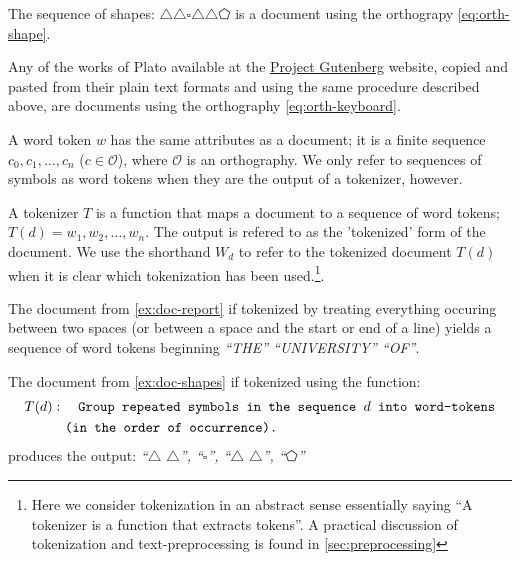 \begin{example}\label{ex:doc-shapes}
    The sequence of shapes: \emph{$\triangle\triangle\square\triangle\triangle\pentagon$} is a document using the orthograpy \ref{eq:orth-shape}.
\end{example}
\vspace{6pt}

\begin{example}\label{ex:doc-plato}
    Any of the works of Plato available at the \href{https://www.gutenberg.org/ebooks/author/93}{Project Gutenberg} website, copied and pasted from their plain text formats and using the same procedure described above, are documents using the orthography \ref{eq:orth-keyboard}.
\end{example}

\begin{definition}
  A word token $w$ has the same attributes as a document; it is a finite sequence $c_0,c_1,\dots,c_n$ ($c\in\mathscr{O}$), where $\mathscr{O}$ is an orthography. We only refer to sequences of symbols as word tokens when they are the output of a tokenizer, however.
\end{definition}

\begin{definition}[Tokenizer]
   A tokenizer $T$ is a function that maps a document to a sequence of word tokens; $T(d)=w_1,w_2,\dots,w_n$. The output is refered to as the 'tokenized' form of the document. We use the shorthand $W_d$ to refer to the tokenized document $T(d)$ when it is clear which tokenization has been used.\footnote{Here we consider tokenization in an abstract sense essentially saying ``A tokenizer is a function that extracts tokens''. A practical discussion of tokenization and text-preprocessing is found in \autoref{sec:preprocessing}}.
\end{definition}

\begin{example}\label{ex:doc-report-t}
  The document from \autoref{ex:doc-report} if tokenized by treating everything occuring between two spaces (or between a space and the start or end of a line) yields a sequence of word tokens beginning \emph{``THE'' ``UNIVERSITY'' ``OF''}.
\end{example}
\vspace{6pt}

\begin{example}\label{ex:doc-shapes-t}
  The document from \autoref{ex:doc-shapes} if tokenized using the function:
  \begin{align*}
    &T(d):\quad \texttt{Group repeated symbols in the sequence $d$ into word-tokens}\\
    &\hphantom{T(d):\ }\texttt{(in the order of occurrence).}
  \end{align*}
  produces the output: \emph{``$\triangle$ $\triangle$'', ``$\square$'', ``$\triangle$ $\triangle$'', ``$\pentagon$''}
\end{example}
\vspace{6pt}

